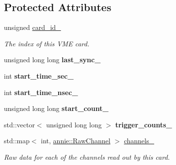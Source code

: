 \subsection*{Protected Attributes}
\begin{DoxyCompactItemize}
\item 
\hypertarget{classannie_1_1RawCard_acb2955d63f6026b4df217009522ffaff}{
unsigned \hyperlink{classannie_1_1RawCard_acb2955d63f6026b4df217009522ffaff}{card\_\-id\_\-}}
\label{classannie_1_1RawCard_acb2955d63f6026b4df217009522ffaff}

\begin{DoxyCompactList}\small\item\em The index of this VME card. \item\end{DoxyCompactList}\item 
\hypertarget{classannie_1_1RawCard_aca184bdded934ced77b3c4fbd4ee79b7}{
unsigned long long {\bfseries last\_\-sync\_\-}}
\label{classannie_1_1RawCard_aca184bdded934ced77b3c4fbd4ee79b7}

\item 
\hypertarget{classannie_1_1RawCard_a7be66f996a0b3ab19d6df08e3f587eb1}{
int {\bfseries start\_\-time\_\-sec\_\-}}
\label{classannie_1_1RawCard_a7be66f996a0b3ab19d6df08e3f587eb1}

\item 
\hypertarget{classannie_1_1RawCard_ae69996894abfd9bb7d9d552ceffea985}{
int {\bfseries start\_\-time\_\-nsec\_\-}}
\label{classannie_1_1RawCard_ae69996894abfd9bb7d9d552ceffea985}

\item 
\hypertarget{classannie_1_1RawCard_a52d8ffe7d27dbdcb414e887052ea4c6d}{
unsigned long long {\bfseries start\_\-count\_\-}}
\label{classannie_1_1RawCard_a52d8ffe7d27dbdcb414e887052ea4c6d}

\item 
\hypertarget{classannie_1_1RawCard_ad102923abf890841a4d1543048987ef8}{
std::vector$<$ unsigned long long $>$ {\bfseries trigger\_\-counts\_\-}}
\label{classannie_1_1RawCard_ad102923abf890841a4d1543048987ef8}

\item 
std::map$<$ int, \hyperlink{classannie_1_1RawChannel}{annie::RawChannel} $>$ \hyperlink{classannie_1_1RawCard_a2511d83c56ea8107a92c27bf4c9d662b}{channels\_\-}
\begin{DoxyCompactList}\small\item\em Raw data for each of the channels read out by this card. \item\end{DoxyCompactList}\end{DoxyCompactItemize}


